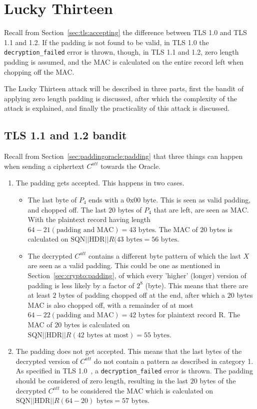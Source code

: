 \documentclass[10pt,conference,a4paper]{IEEEtran}
\begin{document}
\section{Lucky Thirteen}
\label{sec:lucky}
Recall from Section~\ref{sec:tls:accepting} the difference between TLS 1.0 and TLS 1.1 and 1.2. If the padding is not found to be valid, in TLS 1.0 the \texttt{decryption\_failed} error is thrown, though, in TLS 1.1 and 1.2, zero length padding is assumed, and the MAC is calculated on the entire record left when chopping off the MAC.

The Lucky Thirteen attack will be described in three parts, first the bandit of applying zero length padding is discussed, after which the complexity of the attack is explained, and finally the practicality of this attack is discussed.

\subsection{TLS 1.1 and 1.2 bandit}
\label{sec:lucky:bandit}
Recall from Section~\ref{sec:paddingoracle:padding} that three things can happen when sending a ciphertext $C^{att}$ towards the Oracle.
\begin{enumerate}
  \item The padding gets accepted. This happens in two cases.
	\begin{itemize}
		\item The last byte of $P_4$ ends with a $0\text{x}00$ byte. This is seen as valid padding, and chopped off. The last $20$ bytes of $P_4$ that are left, are seen as MAC. With the plaintext record having length $64 - 21 (\text{padding and MAC}) = 43 \text{ bytes}$. The MAC of $20$ bytes is calculated on $\text{SQN} || \text{HDR} || R (43 \text{ bytes} = 56\text{ bytes}$.
		\item The decrypted $C^{att}$ contains a different byte pattern of which the last $X$ are seen as a valid padding. This could be one as mentioned in Section~\ref{sec:crypto:padding}, of which every 'higher' (longer) version of padding is less likely by a factor of $2^8$ (byte). This means that there are at least $2$ bytes of padding chopped off at the end, after which a $20$ bytes MAC is also chopped off, with a remainder of at most $64 - 22 (\text{padding and MAC}) = 42 \text{ bytes}$ for plaintext record R. The MAC of $20$ bytes is calculated on $\text{SQN} || \text{HDR} || R (42 \text{ bytes at most}) = 55\text{ bytes}$.
	\end{itemize}
  \item The padding does not get accepted. This means that the last bytes of the decrypted version of $C^{att}$ do not contain a pattern as described in category 1. As specified in TLS 1.0~\cite{dierks1999rfc}, a \texttt{decryption\_failed} error is thrown. The padding should be considered of zero length, resulting in the last $20$ bytes of the decrypted $C^{att}$ to be considered the MAC which is calculated on $\text{SQN} || \text{HDR} || R (64 - 20) \text{ bytes} = 57\text{ bytes}$.
\end{enumerate}
\end{document}
